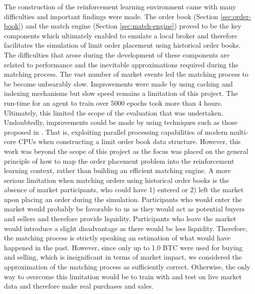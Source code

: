     The construction of the reinforcement learning environment came with many difficulties and important findings were made.
    The order book (Section \ref{sec:order-book}) and the match engine (Section \ref{sec:match-engine}) proved to be the key components which ultimately enabled to emulate a local broker and therefore facilitates the simulation of limit order placement using historical order books.
    The difficulties that arose during the development of these components are related to performance and the inevitable approximations required during the matching process.
    The vast number of market events led the matching process to be become unbearably slow.
    Improvements were made by using caching and indexing mechanisms but slow speed remains a limitation of this project. The run-time for an agent to train over 5000 epochs took more than 4 hours. Ultimately, this limited the scope of the evaluation that was undertaken. 
    Undoubtedly, improvements could be made by using techniques such as those proposed in \cite{barazzutti2016exploiting}.
    That is, exploiting parallel processing capabilities of modern multi-core CPUs when constructing a limit order book data structure.
    However, this work was beyond the scope of this project as the focus was placed on the general principle of how to map the order placement problem into the reinforcement learning context, rather than building an efficient matching engine.
    A more serious limitation when matching orders using historical order books is the absence of market participants, who could have 1) entered or 2) left the market upon placing an order during the simulation.
    Participants who would enter the market would probably be favorable to us as they would act as potential buyers and sellers and therefore provide liquidity.
    Participants who leave the market would introduce a slight disadvantage as there would be less liquidity.
    Therefore, the matching process is strictly speaking an estimation of what would have happened in the past.
    However, since only up to 1.0 BTC were used for buying and selling, which is insignificant in terms of market impact\cite{hautsch2012market}, we considered the approximation of the matching process as sufficiently correct.
    Otherwise, the only way to overcome this limitation would be to train with and test on live market data and therefore make real purchases and sales.
    
